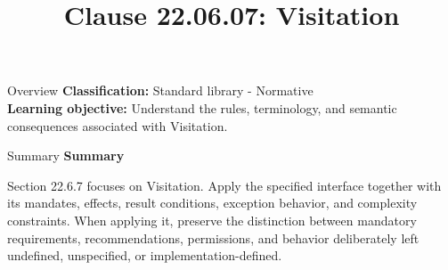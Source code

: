 \documentclass[10pt,letterpaper]{article}
\title{Clause 22.06.07: Visitation}
\author{}
\date{}
\begin{document}
\maketitle
\begin{CornellOverviewBox}{Overview}
\textbf{Classification:} Standard library - Normative\\[2pt]
\textbf{Learning objective:} Understand the rules, terminology, and semantic consequences associated with Visitation.
\end{CornellOverviewBox}\begin{CornellSummaryBox}{Summary}
{\sffamily\bfseries\color{Accent} Summary}\par\vspace{3pt}Section 22.6.7 focuses on Visitation. Apply the specified interface together with its mandates, effects, result conditions, exception behavior, and complexity constraints. When applying it, preserve the distinction between mandatory requirements, recommendations, permissions, and behavior deliberately left undefined, unspecified, or implementation-defined.
\end{CornellSummaryBox}
\end{document}
